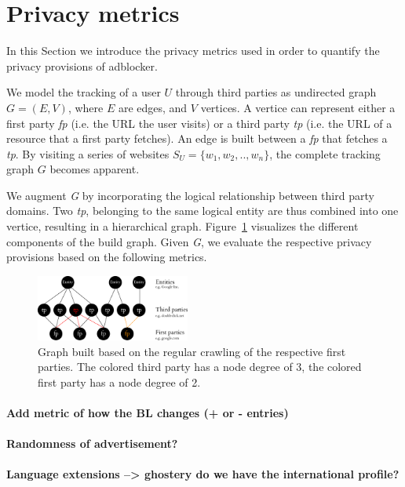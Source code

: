 \documentclass{sig-alternate}
\begin{document}
\section{Privacy metrics} \label{sec:background}
In this Section we introduce the privacy metrics used in order to quantify the privacy provisions of adblocker.

We model the tracking of a user $U$ through third parties as undirected graph $G=(E,V)$, where $E$ are edges, and $V$ vertices. A vertice can represent either a first party \emph{fp} (i.e. the URL the user visits) or a third party \emph{tp} (i.e. the URL of a resource that a first party fetches). An edge is built between a \emph{fp} that fetches a \emph{tp}. By visiting a series of websites $S_U = \{w_1, w_2, .. , w_n\}$, the complete tracking graph $G$ becomes apparent.

We augment \emph{G} by incorporating the logical relationship between third party domains. Two \emph{tp}, belonging to the same logical entity are thus combined into one vertice, resulting in a hierarchical graph. Figure~\ref{fig:graph} visualizes the different components of the build graph. Given \emph{G}, we evaluate the respective privacy provisions based on the following metrics.

\begin{figure}[htb!]
  \centering
  \includegraphics[width=0.45\textwidth]{figures/graph.eps}
  \caption{Graph built based on the regular crawling of the respective first parties. The colored third party has a node degree of 3, the colored first party has a node degree of 2.}\label{fig:graph}
\end{figure}

\paragraph{Add metric of how the BL changes (+ or - entries)}
\paragraph{Randomness of advertisement?}
\paragraph{Language extensions --> ghostery do we have the international profile?}
\end{document}
